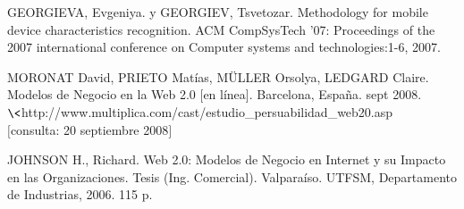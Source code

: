 \renewcommand{\refname}{Referencias}
\begin{thebibliography}{99}

 GEORGIEVA, Evgeniya. y GEORGIEV, Tsvetozar. Methodology for mobile device characteristics recognition. ACM CompSysTech '07: Proceedings of the 2007 international conference on Computer systems and technologies:1-6, 2007.

MORONAT David, PRIETO Matías, MÜLLER Orsolya, LEDGARD Claire. Modelos de Negocio en la Web 2.0 [en línea]. Barcelona, España. sept 2008.\\
$\<$http://www.multiplica.com/cast/estudio\_persuabilidad\_web20.asp$\>$\\
$[$consulta: 20 septiembre 2008$]$

JOHNSON H., Richard. Web 2.0: Modelos de Negocio en Internet y su Impacto en las Organizaciones. Tesis (Ing. Comercial). Valparaíso. UTFSM, Departamento de Industrias, 2006. 115 p.

\end{thebibliography}
